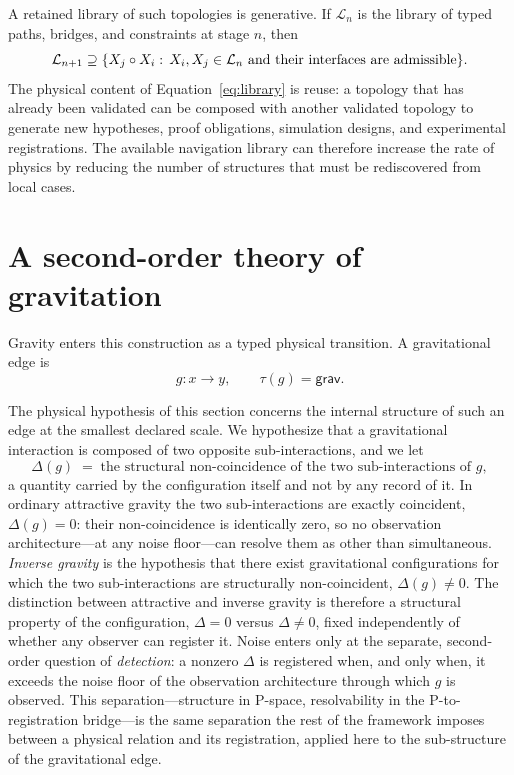 \documentclass[10pt,twoside,a5paper]{article}
\newcommand{\Grav}{\ensuremath{\mathsf{grav}}}
\theoremstyle{definition}
\begin{document}
A retained library of such topologies is generative. If $\mathcal L_n$ is the
library of typed paths, bridges, and constraints at stage $n$, then
\begin{equation}
\mathcal L_{n+1}\supseteq
\{X_j\circ X_i:\,X_i,X_j\in\mathcal L_n\ \hbox{and their interfaces are admissible}\}.
\label{eq:library}
\end{equation}
The physical content of Equation~\eqref{eq:library} is reuse: a topology that has
already been validated can be composed with another validated topology to generate
new hypotheses, proof obligations, simulation designs, and experimental
registrations. The available navigation library can therefore increase the rate of
physics by reducing the number of structures that must be rediscovered from local
cases.


\section{A second-order theory of gravitation}
\label{sec:gravity}

Gravity enters this construction as a typed physical transition. A gravitational
edge is
\begin{equation}
g:x\longrightarrow y,
\qquad \tau(g)=\Grav.
\label{eq:gravity-edge}
\end{equation}

The physical hypothesis of this section concerns the internal structure of such an
edge at the smallest declared scale. We hypothesize that a gravitational interaction
is composed of two opposite sub-interactions, and we let
\begin{equation}
\Delta(g)\;=\;\text{the structural non-coincidence of the two sub-interactions of }g,
\label{eq:delta-definition}
\end{equation}
a quantity carried by the configuration itself and not by any record of it. In
ordinary attractive gravity the two sub-interactions are exactly coincident,
$\Delta(g)=0$: their non-coincidence is identically zero, so no observation
architecture---at any noise floor---can resolve them as other than simultaneous.
\emph{Inverse gravity} is the hypothesis that there exist gravitational configurations
for which the two sub-interactions are structurally non-coincident,
$\Delta(g)\neq 0$. The distinction between attractive and inverse gravity is therefore
a structural property of the configuration, $\Delta=0$ versus $\Delta\neq0$, fixed
independently of whether any observer can register it. Noise enters only at the
separate, second-order question of \emph{detection}: a nonzero $\Delta$ is registered
when, and only when, it exceeds the noise floor of the observation architecture
through which $g$ is observed. This separation---structure in P-space, resolvability
in the P-to-registration bridge---is the same separation the rest of the framework
imposes between a physical relation and its registration, applied here to the
sub-structure of the gravitational edge.
\end{document}
